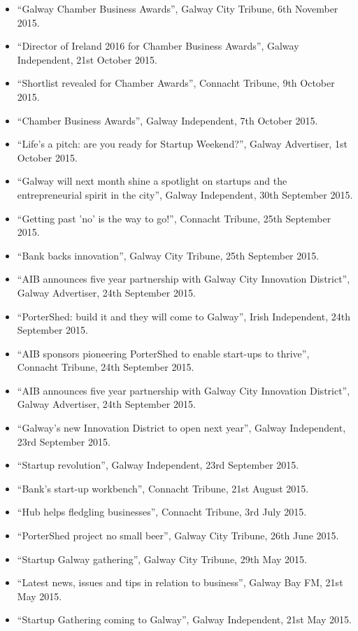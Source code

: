 \documentclass[10pt,a4paper]{res} %
\begin{document}
\begin{resume}
{\begin{itemize}
\item ``Galway Chamber Business Awards'', Galway City Tribune, 6th November 2015.
\item ``Director of Ireland 2016 for Chamber Business Awards'', Galway Independent, 21st October 2015.
\item ``Shortlist revealed for Chamber Awards'', Connacht Tribune, 9th October 2015.
\item ``Chamber Business Awards'', Galway Independent, 7th October 2015.
\item ``Life's a pitch: are you ready for Startup Weekend?'', Galway Advertiser, 1st October 2015.
\item ``Galway will next month shine a spotlight on startups and the entrepreneurial spirit in the city'', Galway Independent, 30th September 2015.
\item ``Getting past 'no' is the way to go!'', Connacht Tribune, 25th September 2015.
\item ``Bank backs innovation'', Galway City Tribune, 25th September 2015.
\item ``AIB announces five year partnership with Galway City Innovation District'', Galway Advertiser, 24th September 2015.
\item ``PorterShed: build it and they will come to Galway'', Irish Independent, 24th September 2015.
\item ``AIB sponsors pioneering PorterShed to enable start-ups to thrive'', Connacht Tribune, 24th September 2015.
\item ``AIB announces five year partnership with Galway City Innovation District'', Galway Advertiser, 24th September 2015.
\item ``Galway's new Innovation District to open next year'', Galway Independent, 23rd September 2015.
\item ``Startup revolution'', Galway Independent, 23rd September 2015.
\item ``Bank's start-up workbench'', Connacht Tribune, 21st August 2015.
\item ``Hub helps fledgling businesses'', Connacht Tribune, 3rd July 2015.
\item ``PorterShed project no small beer'', Galway City Tribune, 26th June 2015.
\item ``Startup Galway gathering'', Galway City Tribune, 29th May 2015.
\item ``Latest news, issues and tips in relation to business'', Galway Bay FM, 21st May 2015.
\item ``Startup Gathering coming to Galway'', Galway Independent, 21st May 2015.

\end{itemize}}
\end{resume}
\end{document}
